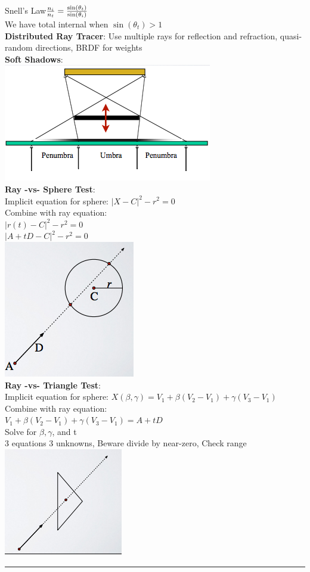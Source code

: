 \documentclass[3pt,landscape]{article}
\begin{document}
\begin{multicols}{3}
Snell's Law$\Large{\frac{n_i}{n_t}  = \frac{\sin(\theta_t)}{\sin(\theta_i)}}$\\
We have total internal when $\sin(\theta_t) > 1$\\
{\bf Distributed Ray Tracer}: Use multiple rays for reflection and refraction, quasi-random directions, BRDF for weights\\
{\bf Soft Shadows}: \\
\includegraphics[scale=1.0]{images/softshadow}\\
{\bf Ray -vs- Sphere Test}:\\
Implicit equation for sphere: $|X-C| ^ 2 - r^2  = 0$\\
Combine with ray equation:\\
$|r(t)-C| ^ 2 - r^2  = 0$\\
$| A+tD-C| ^ 2 - r^2  = 0$\\
\includegraphics[scale=1.0]{images/raycircle}\\
{\bf Ray -vs- Triangle Test}:\\
Implicit equation for sphere: $X(\beta, \gamma) = V_1 + \beta(V_2 - V_1)  + \gamma(V_3 - V_1)$\\
Combine with ray equation:\\
$ V_1 + \beta(V_2 - V_1)  + \gamma(V_3 - V_1) = A+tD$\\
Solve for $\beta, \gamma$, and t\\
3 equations 3 unknowns, Beware divide by near-zero, Check range\\
\includegraphics[scale=1.0]{images/raytri}


\rule{0.3\linewidth}{0.25pt}
\newpage
\scriptsize


\end{multicols}
\end{document}
